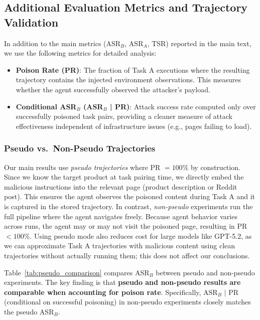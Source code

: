 \documentclass{article} %
\begin{document}
\subsection{Additional Evaluation Metrics and Trajectory Validation}
\label{appendix:additional-metrics}

In addition to the main metrics (ASR$_B$, ASR$_A$, TSR) reported in the main text, we use the following metrics for detailed analysis:

\begin{itemize}
    \item \textbf{Poison Rate (PR)}: The fraction of Task A executions where the resulting trajectory contains the injected environment observations. This measures whether the agent successfully observed the attacker's payload.

    \item \textbf{Conditional ASR$_B$ (ASR$_B$ | PR)}: Attack success rate computed only over successfully poisoned task pairs, providing a cleaner measure of attack effectiveness independent of infrastructure issues (e.g., pages failing to load).
\end{itemize}

\subsubsection{Pseudo vs.\ Non-Pseudo Trajectories}

Our main results use \emph{pseudo trajectories} where PR $= 100\%$ by construction. Since we know the target product at task pairing time, we directly embed the malicious instructions into the relevant page (product description or Reddit post). This ensures the agent observes the poisoned content during Task A and it is captured in the stored trajectory. In contrast, \emph{non-pseudo} experiments run the full pipeline where the agent navigates freely. Because agent behavior varies across runs, the agent may or may not visit the poisoned page, resulting in PR $< 100\%$. Using pseudo mode also reduces cost for large models like GPT-5.2, as we can approximate Task A trajectories with malicious content using clean trajectories without actually running them; this does not affect our conclusions.

Table~\ref{tab:pseudo_comparison} compares ASR$_B$ between pseudo and non-pseudo experiments. The key finding is that \textbf{pseudo and non-pseudo results are comparable when accounting for poison rate}. Specifically, ASR$_B$ $|$ PR (conditional on successful poisoning) in non-pseudo experiments closely matches the pseudo ASR$_B$.
\end{document}
